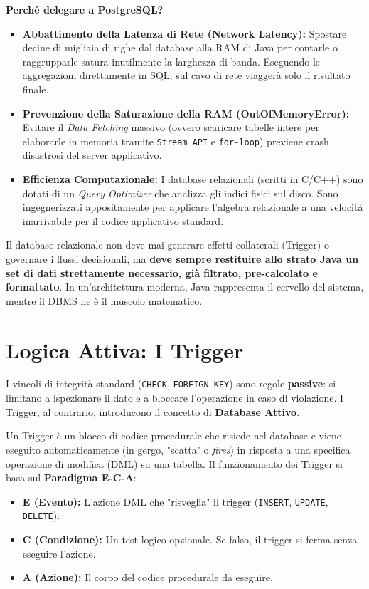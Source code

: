 \textbf{Perché delegare a PostgreSQL?}
\begin{itemize}
    \item \textbf{Abbattimento della Latenza di Rete (Network Latency):} Spostare decine di migliaia di righe dal database alla RAM di Java per contarle o raggrupparle satura inutilmente la larghezza di banda. Eseguendo le aggregazioni direttamente in SQL, sul cavo di rete viaggerà solo il risultato finale.
    \item \textbf{Prevenzione della Saturazione della RAM (OutOfMemoryError):} Evitare il \textit{Data Fetching} massivo (ovvero scaricare tabelle intere per elaborarle in memoria tramite \texttt{Stream API} e \texttt{for-loop}) previene crash disastrosi del server applicativo.
    \item \textbf{Efficienza Computazionale:} I database relazionali (scritti in C/C++) sono dotati di un \textit{Query Optimizer} che analizza gli indici fisici sul disco. Sono ingegnerizzati appositamente per applicare l'algebra relazionale a una velocità inarrivabile per il codice applicativo standard.
\end{itemize}

\begin{observation}
Il database relazionale non deve mai generare effetti collaterali (Trigger) o governare i flussi decisionali, ma \textbf{deve sempre restituire allo strato Java un set di dati strettamente necessario, già filtrato, pre-calcolato e formattato}. In un'architettura moderna, Java rappresenta il cervello del sistema, mentre il DBMS ne è il muscolo matematico.
\end{observation}


\section{Logica Attiva: I Trigger}

I vincoli di integrità standard (\texttt{CHECK}, \texttt{FOREIGN KEY}) sono regole \textbf{passive}: si limitano a ispezionare il dato e a bloccare l'operazione in caso di violazione. I Trigger, al contrario, introducono il concetto di \textbf{Database Attivo}. 

Un Trigger è un blocco di codice procedurale che risiede nel database e viene eseguito automaticamente (in gergo, "scatta" o \textit{fires}) in risposta a una specifica operazione di modifica (DML) su una tabella.
Il funzionamento dei Trigger si basa sul \textbf{Paradigma E-C-A}:
\begin{itemize}
    \item \textbf{E (Evento):} L'azione DML che "risveglia" il trigger (\texttt{INSERT}, \texttt{UPDATE}, \texttt{DELETE}).
    \item \textbf{C (Condizione):} Un test logico opzionale. Se falso, il trigger si ferma senza eseguire l'azione.
    \item \textbf{A (Azione):} Il corpo del codice procedurale da eseguire.
\end{itemize}

